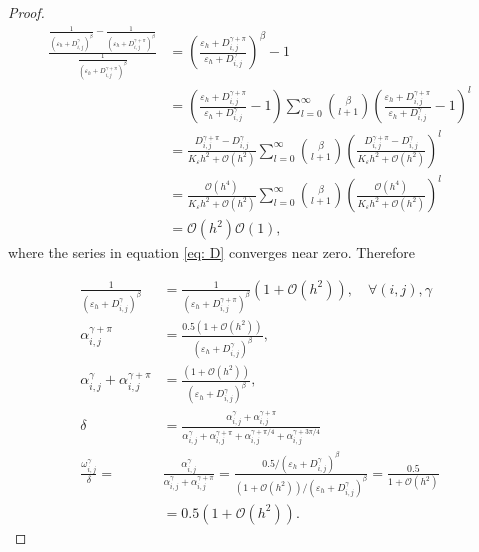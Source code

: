 \begin{proof}
\begin{equation}\label{eq: D}
	\begin{aligned}
		\frac{\frac{1}{\left(\varepsilon_h+D^\gamma_{i, j}\right)^\beta}-\frac{1}{\left(\varepsilon_h+D^{\gamma+\pi}_{i, j}\right)^\beta}}{\frac{1}{\left(\varepsilon_h+D^{\gamma+\pi}_{i, j}\right)^\beta}} & =\left(\frac{\varepsilon_h+D^{\gamma+\pi}_{i, j}}{\varepsilon_h+D^\gamma_{i, j}}\right)^\beta-1 \\
		& =\left(\frac{\varepsilon_h+D^{\gamma+\pi}_{i, j}}{\varepsilon_h+D^\gamma_{i, j}}-1\right) \sum_{l=0}^\infty {{\beta}\choose{l+1}} \left(\frac{\varepsilon_h+D^{\gamma+\pi}_{i, j}}{\varepsilon_h+D^\gamma_{i, j}}-1\right)^l \\
		& =\frac{D^{\gamma+\pi}_{i, j}-D^\gamma_{i, j}}{K_\varepsilon h^2+\mathcal{O}\left(h^2\right)} \sum_{l=0}^\infty {{\beta}\choose{l+1}} \left(\frac{D^{\gamma+\pi}_{i, j}-D^\gamma_{i, j}}{K_\varepsilon h^2+\mathcal{O}\left(h^2\right)}\right)^l \\
		& =\frac{\mathcal{O}\left(h^{4}\right)}{K_\varepsilon h^2+\mathcal{O}\left(h^2\right)} \sum_{l=0}^{\infty} {{\beta}\choose{l+1}}\left(\frac{\mathcal{O}\left(h^{4}\right)}{K_\varepsilon h^2+\mathcal{O}\left(h^2\right)}\right)^l\\
		& =\mathcal{O}\left(h^2\right) \mathcal{O}\left(1\right) ,
	\end{aligned}
\end{equation}
where the series in equation \eqref{eq: D} converges near zero.
Therefore

\begin{equation}
	\begin{aligned}
	\frac{1}{\left(\varepsilon_h+D^\gamma_{i, j}\right)^\beta}&=\frac{1}{\left(\varepsilon_h+D^{\gamma+\pi}_{i, j}\right)^\beta}\left(1+\mathcal{O}\left(h^2\right)\right), \quad \forall(i, j),\gamma \\	
	\alpha^{\gamma+\pi}_{i, j}&=\frac{0.5\left(1+\mathcal{O}\left(h^2\right)\right)}{\left(\varepsilon_h+D^{\gamma}_{i, j}\right)^\beta}, \\
	\alpha^\gamma_{i, j}+\alpha^{\gamma+\pi}_{i, j}&=\frac{\left(1+\mathcal{O}\left(h^2\right)\right)}{\left(\varepsilon_h+D^{\gamma}_{i, j}\right)^\beta},\\	
	\delta&=\frac{\alpha^\gamma_{i, j}+\alpha^{\gamma+\pi}_{i, j}}{\alpha^\gamma_{i, j}+\alpha^{\gamma+\pi}_{i, j}+\alpha^{\gamma+\pi/4}_{i, j}+\alpha^{\gamma+3\pi/4}_{i, j}}\\
	\frac{\omega_{i,j}^\gamma}{\delta}=&\frac{\alpha^\gamma_{i, j}}{\alpha^\gamma_{i, j}+\alpha^{\gamma+\pi}_{i, j}} =\frac{0.5 /\left(\varepsilon_h+D^{\gamma}_{i, j}\right)^\beta}{\left(1+\mathcal{O}\left(h^2\right)\right) /\left(\varepsilon_h+D^{\gamma}_{i, j}\right)^\beta}
	=\frac{0.5}{1+\mathcal{O}\left(h^2\right)} \\
	& = 0.5\left(1+\mathcal{O}\left(h^2\right)\right).
	\end{aligned} \label{defdelta}
\end{equation}		


\end{proof}
